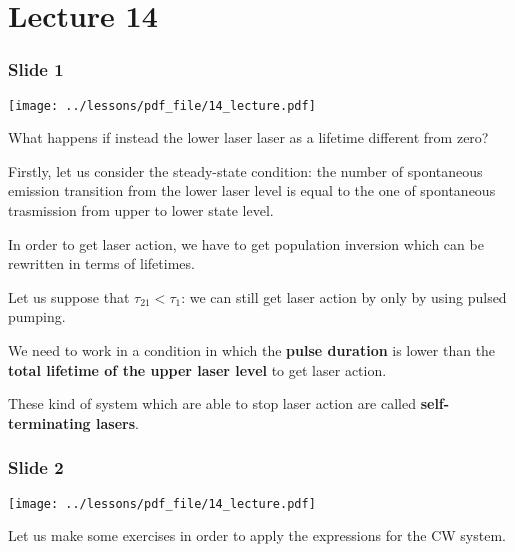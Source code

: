 \documentclass[../main/main.tex]{subfiles}
\begin{document}
\pagestyle{plain}

\section{Lecture 14}


\subsubsection*{Slide 1}

\begin{minipage}[]{0.5\linewidth}
\centering
\texttt{[image: ../lessons/pdf\_file/14\_lecture.pdf]}
\end{minipage}
\hspace{0.3cm}\vspace{0.3cm}
\begin{minipage}[c]{0.47\linewidth}

What happens if instead the lower laser laser as a lifetime different from zero?

Firstly, let us consider the steady-state condition: the number of spontaneous emission transition from the lower laser level is equal to the one of spontaneous trasmission from upper to lower state level.

In order to get laser action, we have to get population inversion which can be rewritten in terms of lifetimes.

Let us suppose that \( \tau _{21} < \tau _1 \): we can still get laser action by only by using pulsed pumping.

We need to work in a condition in which the \textbf{pulse duration} is lower than the \textbf{total lifetime of the upper laser level} to get laser action.

\end{minipage}

These kind of system which are able to stop laser action are called \textbf{self-terminating lasers}.

\subsubsection*{Slide 2}

\begin{minipage}[]{0.5\linewidth}
\centering
\texttt{[image: ../lessons/pdf\_file/14\_lecture.pdf]}
\end{minipage}
\hspace{0.3cm}\vspace{0.3cm}
\begin{minipage}[c]{0.47\linewidth}

Let us make some exercises in order to apply the expressions for the CW system.

\end{minipage}
\end{document}
